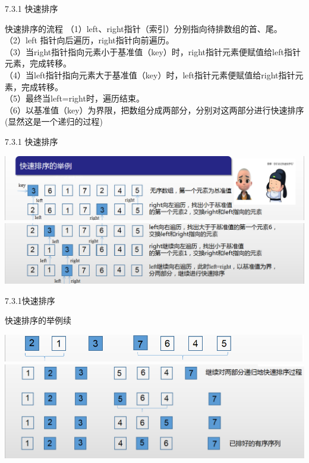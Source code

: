 \begin{frame}[fragile]{7.3.1 快速排序}

\begin{block}{快速排序的流程}
（1）left、right指针（索引）分别指向待排数组的首、尾。\\
（2）left 指针向后遍历，right指针向前遍历。\\
（3）当right指针指向元素小于基准值（key）时，right指针元素便赋值给left指针元素，完成转移。\\
（4）当left指针指向元素大于基准值（key）时，left指针元素便赋值给right指针元素，完成转移。\\
（5）最终当left=right时，遍历结束。\\
（6）以基准值（key）为界限，把数组分成两部分，分别对这两部分进行快速排序(显然这是一个递归的过程)\\
\end{block}

\end{frame}
\begin{frame}[fragile]{7.3.1 快速排序}
\begin{center}
 \includegraphics[scale=0.38]{quick_sort_1.png}\\
\includegraphics[scale=0.38]{quick_sort_2.png}
\end{center}
\end{frame}
\begin{frame}[fragile]{7.3.1快速排序}
\begin{block}{快速排序的举例续}
\end{block}
\begin{center}
\includegraphics[scale=0.38]{quick_sort_6.png}
\includegraphics[scale=0.38]{quick_sort_7.png}
\end{center}
\end{frame}

